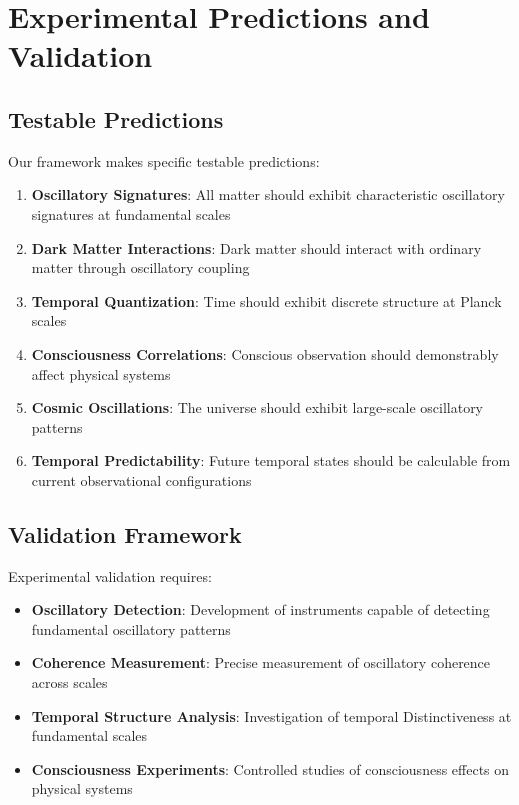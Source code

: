 \documentclass[11pt]{article}
\theoremstyle{remark}
\begin{document}
\section{Experimental Predictions and Validation}

\subsection{Testable Predictions}

Our framework makes specific testable predictions:

\begin{enumerate}
\item \textbf{Oscillatory Signatures}: All matter should exhibit characteristic oscillatory signatures at fundamental scales
\item \textbf{Dark Matter Interactions}: Dark matter should interact with ordinary matter through oscillatory coupling
\item \textbf{Temporal Quantization}: Time should exhibit discrete structure at Planck scales
\item \textbf{Consciousness Correlations}: Conscious observation should demonstrably affect physical systems
\item \textbf{Cosmic Oscillations}: The universe should exhibit large-scale oscillatory patterns
\item \textbf{Temporal Predictability}: Future temporal states should be calculable from current observational configurations
\end{enumerate}

\subsection{Validation Framework}

Experimental validation requires:

\begin{itemize}
\item \textbf{Oscillatory Detection}: Development of instruments capable of detecting fundamental oscillatory patterns
\item \textbf{Coherence Measurement}: Precise measurement of oscillatory coherence across scales
\item \textbf{Temporal Structure Analysis}: Investigation of temporal Distinctiveness at fundamental scales
\item \textbf{Consciousness Experiments}: Controlled studies of consciousness effects on physical systems
\end{itemize}
\end{document}
